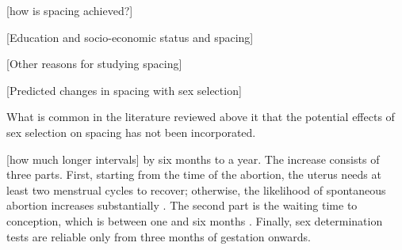 [how is spacing achieved?]
\citep{Rahman1993}
\citep{Jayachandran2011}
\citep{Alam2018}


[Education and socio-economic status and spacing]






[Other reasons for studying spacing]


[Predicted changes in spacing with sex selection]

What is common in the literature reviewed above it that the potential effects of 
sex selection on spacing has not been incorporated.

[how much longer intervals]
 by six months to a year.
The increase consists of three parts.
First, starting from the time of the abortion, the uterus needs at 
least two menstrual cycles to recover;  otherwise, the likelihood 
of spontaneous abortion increases substantially \citep{zhou00b}.
The second part is the waiting time to conception, which is between 
one and six months \citep{Wang2003}.
Finally, sex determination tests are reliable only from three months 
of gestation onwards.

 
